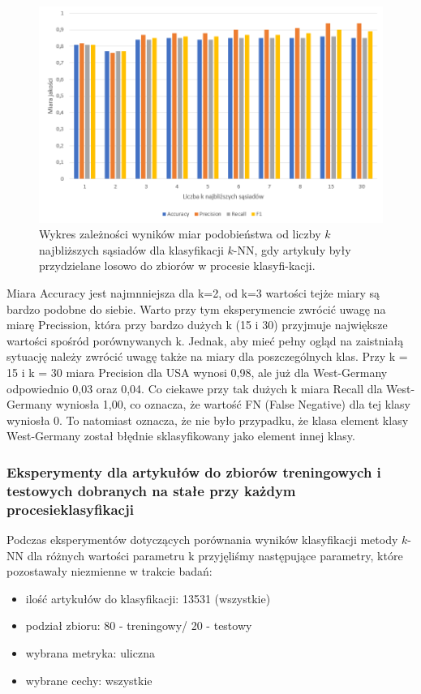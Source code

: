 \documentclass{classrep}
\begin{document}
\begin{figure}[H]
    \centering
    \includegraphics[width=14cm]{wykres_k.png}
    \caption{Wykres zależności wyników miar podobieństwa od liczby $k$ najbliższych sąsiadów dla klasyfikacji $k$-NN, gdy artykuły były przydzielane losowo do zbiorów w procesie klasyfi-kacji.}
    \label{wykres:k}
\end{figure}

Miara Accuracy jest najmnniejsza dla k=2, od k=3 wartości tejże miary są bardzo podobne do siebie. Warto przy tym eksperymencie zwrócić uwagę na miarę Precission, która przy bardzo dużych k (15 i 30) przyjmuje największe wartości spośród porównywanych k. Jednak, aby mieć pełny ogląd na zaistniałą sytuację należy zwrócić uwagę także na miary dla poszczególnych klas. Przy k = 15 i k = 30 miara Precision dla USA wynosi 0,98, ale już dla West-Germany odpowiednio 0,03 oraz 0,04. Co ciekawe przy tak dużych k miara Recall dla West-Germany wyniosła 1,00, co oznacza, że wartość FN (False Negative) dla tej klasy wyniosła 0. To natomiast oznacza, że nie było przypadku, że klasa element klasy West-Germany został błędnie sklasyfikowany jako element innej klasy.

\subsubsection{ Eksperymenty dla artykułów do zbiorów treningowych i testowych dobranych na stałe przy każdym procesieklasyfikacji}

Podczas eksperymentów dotyczących porównania wyników klasyfikacji metody $k$-NN dla różnych wartości parametru k przyjęliśmy następujące parametry, które pozostawały niezmienne w trakcie badań:
\begin{itemize}
    \item ilość artykułów do klasyfikacji: 13531 (wszystkie)
    \item podział zbioru: 80 - treningowy/ 20 - testowy
    \item wybrana metryka: uliczna
    \item wybrane cechy: wszystkie
\end{itemize}
\end{document}
